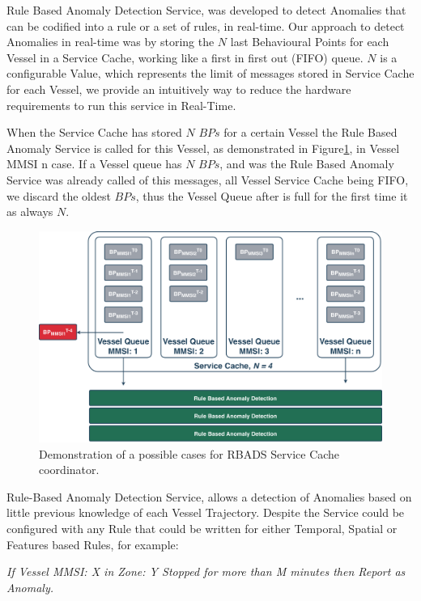 Rule Based Anomaly Detection Service, was developed to detect Anomalies that can be codified into a rule or a set of rules, in real-time. 
Our approach to detect Anomalies in real-time was by storing the $N$ last Behavioural Points for each Vessel in a Service Cache, working like a first in first out (FIFO) queue. $N$ is a configurable Value, which represents the limit of messages stored in Service Cache for each Vessel, we provide an intuitively way to reduce the hardware requirements to run this service in Real-Time.

When the Service Cache has stored $N$ $BPs$ for a certain Vessel the Rule Based Anomaly Service is called for this Vessel, as demonstrated in Figure\ref{fig: RBADS}, in Vessel MMSI n case.
If a Vessel queue has $N$ $BPs$, and was the Rule Based Anomaly Service was already called of this messages, all Vessel Service Cache being FIFO, we discard the oldest $BPs$, thus the Vessel Queue after is full for the first time it as always $N$.

\begin{figure}[H]
	\centering
	\includegraphics[scale = .36]{figures/Ch4/RBADS.pdf}
    \caption{Demonstration of a possible cases for RBADS Service Cache coordinator.}
    \label{fig: RBADS}
\end{figure}

Rule-Based Anomaly Detection Service, allows a detection of Anomalies based on little previous knowledge of each Vessel Trajectory. Despite the Service could be configured with any Rule that could be written for either Temporal, Spatial or Features based Rules, for example:

\textit{If Vessel MMSI: X in Zone: Y Stopped for more than M minutes then Report as Anomaly.}

